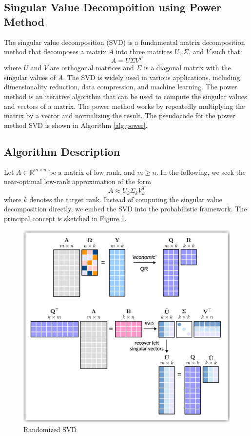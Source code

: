 \documentclass[11pt,a4paper]{article}
\begin{document}
\subsection{Singular Value Decompoition using Power Method}
The singular value decomposition (SVD) is a fundamental matrix decomposition method that decomposes a matrix $A$ into three matrices $U$, $\Sigma$, and $V$ such that:
\[
    A = U \Sigma V^T
\]
where $U$ and $V$ are orthogonal matrices and $\Sigma$ is a diagonal matrix with the singular values of $A$. The SVD is widely used in various applications, including dimensionality reduction, data compression, and machine learning. The power method is an iterative algorithm that can be used to compute the singular values and vectors of a matrix. The power method works by repeatedly multiplying the matrix by a vector and normalizing the result. The pseudocode for the power method SVD is shown in Algorithm \ref{alg:power}.

\subsection{Algorithm Description}
Let $A \in \mathbb{R}^{m \times n}$ be a matrix of low rank, and $m \ge n$.
In the following, we seek the near-optimal low-rank approximation of the form
\[
    A \approx U_k \Sigma_k V_k^T
\]
where $k$ denotes the target rank. Instead of computing the singular value decomposition directly, we embed the SVD into the probabilistic framework. The principal concept is sketched in Figure \ref{fig:rSVD}.

\begin{figure}[H]
    \centering
    \includegraphics[height=0.3\textheight]{Images/rSVD.jpg}
    \caption{Randomized SVD \cite{erichsonRandomizedMatrixDecompositions2019}}
    \label{fig:rSVD}
\end{figure}
\end{document}
